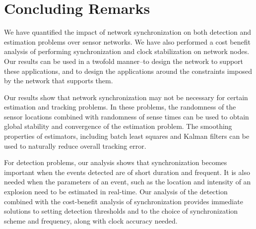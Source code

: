 \section{Concluding Remarks}
We have quantified the impact of network synchronization on both detection and estimation problems over sensor networks. We have also performed a cost benefit analysis of performing synchronization and clock stabilization on network nodes. Our results can be used in a twofold manner--to design the network to support these applications, and to design the applications around the constraints imposed by the network that supports them. 

\indent Our results show that network synchronization may not be necessary for certain estimation and tracking problems. In these problems, the randomness of the sensor locations combined with randomness of sense times can be used to obtain global stability and convergence of the estimation problem. The smoothing properties of estimators, including batch least squares and Kalman filters can be used to naturally reduce overall tracking error.

\indent For detection problems, our analysis shows that synchronization becomes important when the events detected are of short duration and frequent. It is also needed when the parameters of an event, such as the location and intensity of an explosion need to be estimated in real-time. Our analysis of the detection combined with the cost-benefit analysis of synchronization provides immediate solutions to setting detection thresholds and to the choice of synchronization scheme and frequency, along with clock accuracy needed. 